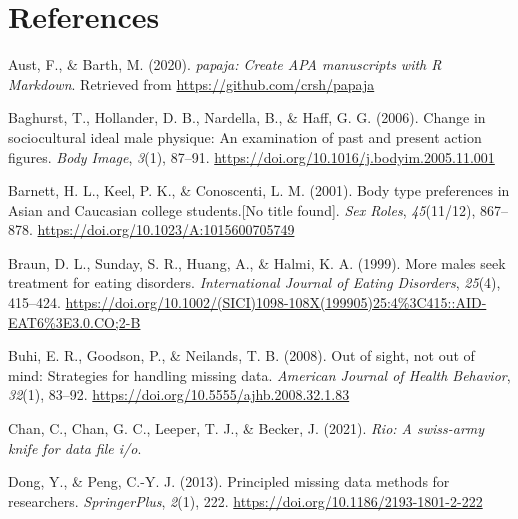 \documentclass[
  english,
  man, fleqn, noextraspace,floatsintext]{apa6}
\newlength{\cslhangindent}
\newlength{\cslentryspacingunit} %
\newenvironment{CSLReferences}[2] %
 {%
  \setlength{\parindent}{0pt}
  \ifodd #1
  \let\oldpar\par
  \def\par{\hangindent=\cslhangindent\oldpar}
  \fi
  \setlength{\parskip}{#2\cslentryspacingunit}
 }%
 {}
\begin{document}
\newpage

\hypertarget{references}{%
\section{References}\label{references}}

\begingroup
\setlength{\parindent}{-0.5in}

\hypertarget{refs}{}
\begin{CSLReferences}{1}{0}
\leavevmode{}%
Aust, F., \& Barth, M. (2020). \emph{{papaja}: {Create} {APA} manuscripts with {R Markdown}}. Retrieved from \url{https://github.com/crsh/papaja}

\leavevmode{}%
Baghurst, T., Hollander, D. B., Nardella, B., \& Haff, G. G. (2006). Change in sociocultural ideal male physique: {An} examination of past and present action figures. \emph{Body Image}, \emph{3}(1), 87--91. \url{https://doi.org/10.1016/j.bodyim.2005.11.001}

\leavevmode{}%
Barnett, H. L., Keel, P. K., \& Conoscenti, L. M. (2001). Body type preferences in {Asian} and {Caucasian} college students.{[}{No} title found{]}. \emph{Sex Roles}, \emph{45}(11/12), 867--878. \url{https://doi.org/10.1023/A:1015600705749}

\leavevmode{}%
Braun, D. L., Sunday, S. R., Huang, A., \& Halmi, K. A. (1999). More males seek treatment for eating disorders. \emph{International Journal of Eating Disorders}, \emph{25}(4), 415--424. \url{https://doi.org/10.1002/(SICI)1098-108X(199905)25:4\%3C415::AID-EAT6\%3E3.0.CO;2-B}

\leavevmode{}%
Buhi, E. R., Goodson, P., \& Neilands, T. B. (2008). Out of sight, not out of mind: Strategies for handling missing data. \emph{American Journal of Health Behavior}, \emph{32}(1), 83--92. \url{https://doi.org/10.5555/ajhb.2008.32.1.83}

\leavevmode{}%
Chan, C., Chan, G. C., Leeper, T. J., \& Becker, J. (2021). \emph{Rio: A swiss-army knife for data file i/o}.

\leavevmode{}%
Dong, Y., \& Peng, C.-Y. J. (2013). Principled missing data methods for researchers. \emph{SpringerPlus}, \emph{2}(1), 222. \url{https://doi.org/10.1186/2193-1801-2-222}


\end{CSLReferences}
\end{document}
